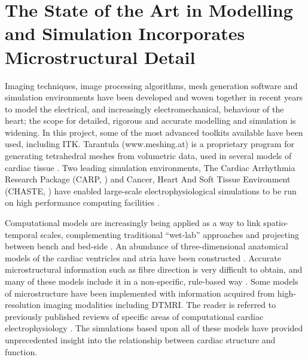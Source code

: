 \section{The State of the Art in Modelling and Simulation Incorporates Microstructural Detail} %
\label{sec:the_state_of_the_art_in_microstructural_modelling_and_simulation_incorporates_microstructural_detail}
  Imaging techniques, image processing algorithms, mesh generation software \cite{Prassl2009} and simulation environments have been developed and woven together in recent years to model the electrical, and increasingly electromechanical, behaviour of the heart; the scope for detailed, rigorous and accurate modelling and simulation is widening. In this project, some of the most advanced toolkits available have been used, including ITK. Tarantula (www.meshing.at) is a proprietary program for generating tetrahedral meshes from volumetric data, used in several models of cardiac tissue \cite{Bernabeu2008,Bishop2006,Plank2009}. Two leading simulation environments, The Cardiac Arrhythmia Research Package (CARP, \cite{Vigmond2003}) and Cancer, Heart And Soft Tissue Environment (CHASTE, \cite{Pitt-Francis2008, Pitt-Francis2009, Pitt-Francis2009a}) have enabled large-scale electrophysiological simulations to be run on high performance computing facilities \cite{Bernabeu2008}.
  
  Computational models are increasingly being applied as a way to link spatio-temporal scales, complementing traditional “wet-lab” approaches and projecting between bench and bed-side \cite{Hunter2010,Kohl2010}. An abundance of three-dimensional anatomical models of the cardiac ventricles and atria have been constructed \cite{Eason1998,Kanai1995,Vetter2005,DeBakker2005,Atkinson2011,Baher2011,Bishop2009,Bishop2012,Bordas2010,Bordas2011,Deo2009,Keller2012,Moreno2011,Niederer2011,Okada2011,Potse2006,Romero2010,Seemann2006,TenTusscher2007,Trayanova2011,Vadakkumpadan2010,Zemzemi2011,Zhao2012,Plotkowiak2008}. Accurate microstructural information such as fibre direction is very difficult to obtain, and many of these models include it in a non-specific, rule-based way \cite{StreeterJr1969}. Some models of microstructure have been implemented with information acquired from high-resolution imaging modalities including DTMRI. The reader is referred to previously published reviews of specific areas of computational cardiac electrophysiology \cite{Rudy2006,Brennan2009,Clayton2010,Clayton2011,Greenstein2011,Trayanova2011,Carusi2012}. The simulations based upon all of these models have provided unprecedented insight into the relationship between cardiac structure and function.

